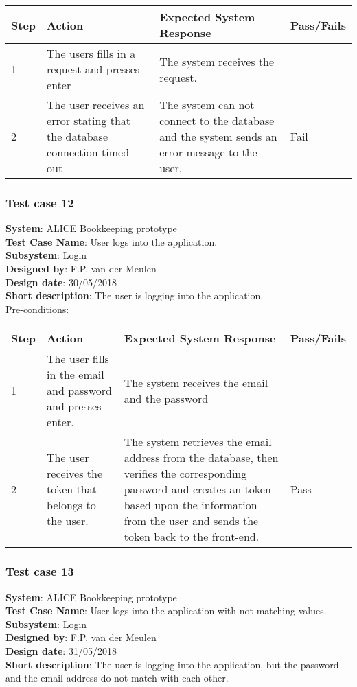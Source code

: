 \begin{longtable}{ | p{0.8cm} | p{4.5cm} | p{6cm} | p{1.5cm} |}
\hline
Step & Action & Expected System Response & Pass/Fails  \\ \hline
1 & The users fills in a request and presses enter  & The system receives the request. &  \\ \hline
2 & The user receives an error stating that the database connection timed out & The system can not connect to the database and the system sends an error message to the user. & Fail \\ \hline
\end{longtable}

\subsubsection{Test case 12}
\textbf{System}:  ALICE Bookkeeping prototype \\
\textbf{Test Case Name}:  User logs into the application. \\
\textbf{Subsystem}:  Login \\
\textbf{Designed by}:  F.P. van der Meulen\\
\textbf{Design date}:  30/05/2018\\
\textbf{Short description}: The user is logging into the application. \\

Pre-conditions: \\

\begin{longtable}{ | p{0.8cm} | p{4.5cm} | p{6cm} | p{1.5cm} |}
\hline
Step & Action & Expected System Response & Pass/Fails  \\ \hline
1 & The user fills in the email and password and presses enter. & The system receives the email and the password &  \\ \hline
2 & The user receives the token that belongs to the user. & The system retrieves the email address from the database, then verifies the corresponding password and creates an token based upon the information from the user and sends the token back to the front-end. & Pass \\ \hline
\end{longtable}
\newpage
\subsubsection{Test case 13}
\textbf{System}:  ALICE Bookkeeping prototype \\
\textbf{Test Case Name}:  User logs into the application with not matching values. \\
\textbf{Subsystem}:  Login \\
\textbf{Designed by}:  F.P. van der Meulen\\
\textbf{Design date}:  31/05/2018\\
\textbf{Short description}: The user is logging into the application, but the password and the email address do not match with each other. \\

